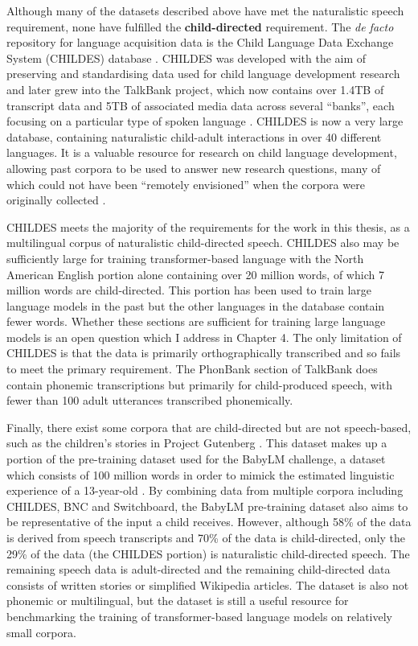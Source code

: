 Although many of the datasets described above have met the naturalistic speech requirement, none have fulfilled the \textbf{child-directed} requirement. The \emph{de facto} repository for language acquisition data is the Child Language Data Exchange System (CHILDES) database \citep{macwhinney1985child}. CHILDES was developed with the aim of preserving and standardising data used for child language development research and later grew into the TalkBank project, which now contains over 1.4TB of transcript data and 5TB of associated media data across several ``banks'', each focusing on a particular type of spoken language \citep{macwhinney_understanding_2019}. CHILDES is now a very large database, containing naturalistic child-adult interactions in over 40 different languages. It is a valuable resource for research on child language development, allowing past corpora to be used to answer new research questions, many of which could not have been ``remotely envisioned'' when the corpora were originally collected \citep{bernstein_ratner_augmenting_2024}. 

CHILDES meets the majority of the requirements for the work in this thesis, as a multilingual corpus of naturalistic child-directed speech. CHILDES also may be sufficiently large for training transformer-based language with the North American English portion alone containing over 20 million words, of which 7 million words are child-directed. This portion has been used to train large language models in the past \citep{huebner-etal-2021-babyberta} but the other languages in the database contain fewer words. Whether these sections are sufficient for training large language models is an open question which I address in Chapter 4. The only limitation of CHILDES is that the data is primarily orthographically transcribed and so fails to meet the primary requirement. The PhonBank section of TalkBank does contain phonemic transcriptions but primarily for child-produced speech, with fewer than 100 adult utterances transcribed phonemically. 

Finally, there exist some corpora that are child-directed but are not speech-based, such as the children's stories in Project Gutenberg \citep{gerlach2018standardizedprojectgutenbergcorpus}. This dataset makes up a portion of the pre-training dataset used for the BabyLM challenge, a dataset which consists of 100 million words in order to mimick the estimated linguistic experience of a 13-year-old \citep{choshen-et-al-2024-callforpapers-babylm2}. By combining data from multiple corpora including CHILDES, BNC and Switchboard, the BabyLM pre-training dataset also aims to be representative of the input a child receives. However, although 58\% of the data is derived from speech transcripts and 70\% of the data is child-directed, only the 29\% of the data (the CHILDES portion) is naturalistic child-directed speech. The remaining speech data is adult-directed and the remaining child-directed data consists of written stories or simplified Wikipedia articles. The dataset is also not phonemic or multilingual, but the dataset is still a useful resource for benchmarking the training of transformer-based language models on relatively small corpora.

